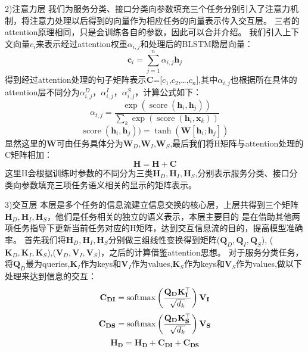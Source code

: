 2)注意力层
我们为服务分类、接口分类向参数填充三个任务分别引入了注意力机制，将注意力处理以后得到的向量作为相应任务的向量表示传入交互层。
三者的attention原理相同，只是会训练各自的参数，因此可以合并介绍。
我们引入上下文向量${c}_{i}$来表示经过attention权重$α_{i,j}$和处理后的BLSTM隐层向量：
\begin{equation}
    \mathbf{c}_{i}=\sum_{j=1}^{n} \alpha_{i, j} \mathbf{h}_{j}
  \end{equation}
  得到经过attention处理的句子矩阵表示$\mathbf{C}$=[$c_{1}$,$c_{2}$,\dots,$c_{n}$],其中$\alpha_{i, j}$也根据所在具体的attention层不同分为$\alpha_{i, j}^{D}$，$\alpha_{i, j}^{I}$，$\alpha_{i, j}^{S}$，计算公式如下：
  \begin{equation}
    \alpha_{t, j}=\frac{\exp \left(\operatorname{score}\left(\mathbf{h}_{i}, \mathbf{h}_{j}\right)\right)}{\sum_{k} \exp \left(\operatorname{score}\left(\mathbf{h}_{i}, \mathbf{x}_{k}\right)\right)}
    \end{equation}
    \begin{equation}
      \operatorname{score}(\mathbf{h}_{i}, \mathbf{h}_{j}))=\tanh \left(\mathbf{W}\left[\mathbf{h}_{i} ; \mathbf{h}_{j}\right]\right)
    \end{equation}
显然这里的$\mathbf{W}$可由任务具体分为$\mathbf{W}_D$,$\mathbf{W}_I$,$\mathbf{W}_S$,最后我们将H矩阵与attention处理的C矩阵相加：
\begin{equation}
  \mathbf{H}=\mathbf{H}+\mathbf{C}
\end{equation}
这里H会根据训练时参数的不同分为三类$\mathbf{H}_{D},\mathbf{H}_{I},\mathbf{H}_{S}$,分别表示服务分类、接口分类向参数填充三项任务语义相关的显示的矩阵表示。

3)交互层
本层是多个任务的信息流建立信息交换的核心层，上层共得到三个矩阵$\mathbf{H}_{D},\mathbf{H}_{I},\mathbf{H}_{S}$，他们是任务相关的独立的语义表示，本层主要目的
是在借助其他两项任务指导下更新当前任务对应的H矩阵，达到交互信息流的目的，提高模型准确率。
首先我们将$\mathbf{H}_{D},\mathbf{H}_{I},\mathbf{H}_{S}$分别做三组线性变换得到矩阵($\mathbf{Q}_{D},\mathbf{Q}_{I},\mathbf{Q}_{S}$),
($\mathbf{K}_{D},\mathbf{K}_{I},\mathbf{K}_{S}$),($\mathbf{V}_{D},\mathbf{V}_{I},\mathbf{V}_{S}$)，之后的计算借鉴attention思想。
对于服务分类任务，将$\mathbf{Q}_{D}$最为queries,$\mathbf{K}_{I}$作为keys和$\mathbf{V}_{I}$作为values,$\mathbf{K}_{S}$作为keys和$\mathbf{V}_{S}$作为values,做以下处理来达到信息的交互：
\begin{equation}
  \mathbf{C}_{\mathbf{DI}}=\operatorname{softmax}\left(\frac{\mathbf{Q}_{\mathbf{D}} \mathbf{K}_{\mathbf{I}}^{\top}}{\sqrt{d_{k}}}\right) \mathbf{V}_{\mathbf{I}}\\
\end{equation}
\begin{equation}  
\mathbf{C}_{\mathbf{DS}}=\operatorname{softmax}\left(\frac{\mathbf{Q}_{\mathbf{D}} \mathbf{K}_{\mathbf{S}}^{\top}}{\sqrt{d_{k}}}\right) \mathbf{V}_{\mathbf{S}}\\
\end{equation}
\begin{equation}  
\mathbf{H}_\mathbf{D}=\mathbf{H}_\mathbf{D}+\mathbf{C}_{\mathbf{DI}}+\mathbf{C}_{\mathbf{DS}}
\end{equation}


